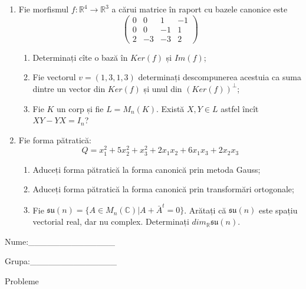 \documentclass{article}
\begin{document}
\begin{enumerate}
 \item Fie morfismul $f:\mathbb{R}^4 \to \mathbb{R}^3$ a cărui matrice în raport cu bazele canonice este
$$\begin{pmatrix}
0&0&1&-1\\
0&0&-1&1\\
2&-3&-3&2
\end{pmatrix}$$

\begin{enumerate}
\item Determinați cîte o bază în $Ker(f)$ și $Im(f)$;
\item Fie vectorul $v=(1,3,1,3)$ determinați descompunerea acestuia ca suma dintre un vector din $Ker(f)$ și unul din $(Ker(f))^\perp$;
\item Fie $K$ un corp și fie $L=M_n(K)$. Există $X,Y \in L$ astfel încît $XY-YX=I_n$?  
\end{enumerate}
\item Fie forma pătratică:
$$Q= x_1^2+5x_2^2+x_3^2+2x_1x_2+6x_1x_3+2x_2x_3$$

\begin{enumerate}
\item Aduceți forma pătratică la forma canonică prin metoda Gauss;
\item Aduceți forma pătratică la forma canonică prin transformări ortogonale;
\item Fie $\mathfrak{su}(n)=\{ A \in M_n(\mathbb{C}) | A+\bar{A}^t=0\}$. Arătați că $\mathfrak{su}(n)$ este spațiu vectorial real, dar nu complex.
Determinați $dim_{\mathbb{R}}\mathfrak{su}(n)$.
\end{enumerate}
\end{enumerate}
\newpage
\begin{flushright}
Nume:\_\_\_\_\_\_\_\_\_\_\_\_\_\_
 
 
Grupa:\_\_\_\_\_\_\_\_\_\_\_\_\_\_
\end{flushright}
\begin{center}
\vspace{2cm}
{\Large Probleme}
\vspace{2cm}
\end{center}
\end{document}
